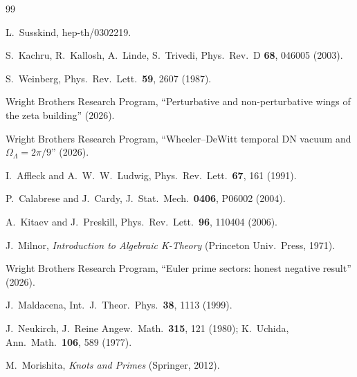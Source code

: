 \documentclass[11pt,a4paper]{article}
\begin{document}
\begin{thebibliography}{99}

L.~Susskind, hep-th/0302219.

S.~Kachru, R.~Kallosh, A.~Linde, S.~Trivedi,
Phys.\ Rev.\ D \textbf{68}, 046005 (2003).

S.~Weinberg, Phys.\ Rev.\ Lett.\ \textbf{59}, 2607 (1987).

Wright Brothers Research Program,
``Perturbative and non-perturbative wings of the zeta building''
(2026).

Wright Brothers Research Program,
``Wheeler--DeWitt temporal DN vacuum and $\Omega_\Lambda = 2\pi/9$''
(2026).

I.~Affleck and A.~W.~W.~Ludwig,
Phys.\ Rev.\ Lett.\ \textbf{67}, 161 (1991).

P.~Calabrese and J.~Cardy,
J.\ Stat.\ Mech.\ \textbf{0406}, P06002 (2004).

A.~Kitaev and J.~Preskill,
Phys.\ Rev.\ Lett.\ \textbf{96}, 110404 (2006).

J.~Milnor, \textit{Introduction to Algebraic K-Theory}
(Princeton Univ.\ Press, 1971).

Wright Brothers Research Program,
``Euler prime sectors: honest negative result'' (2026).

J.~Maldacena, Int.\ J.\ Theor.\ Phys.\ \textbf{38}, 1113 (1999).

J.~Neukirch, J.\ Reine Angew.\ Math.\ \textbf{315}, 121 (1980);
K.~Uchida, Ann.\ Math.\ \textbf{106}, 589 (1977).

M.~Morishita, \textit{Knots and Primes} (Springer, 2012).

\end{thebibliography}
\end{document}
